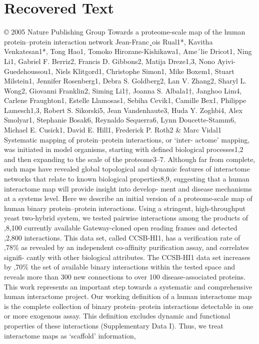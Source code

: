 \section{Recovered Text}
© 2005 Nature Publishing Group
Towards a proteome-scale map of the human
protein–protein interaction network
Jean-Franc¸ois Rual1*, Kavitha Venkatesan1*, Tong Hao1, Tomoko Hirozane-Kishikawa1, Ame´lie Dricot1, Ning Li1,
Gabriel F. Berriz2, Francis D. Gibbons2, Matija Dreze1,3, Nono Ayivi-Guedehoussou1, Niels Klitgord1,
Christophe Simon1, Mike Boxem1, Stuart Milstein1, Jennifer Rosenberg1, Debra S. Goldberg2, Lan V. Zhang2,
Sharyl L. Wong2, Giovanni Franklin2, Siming Li1†, Joanna S. Albala1†, Janghoo Lim4, Carlene Fraughton1,
Estelle Llamosas1, Sebiha Cevik1, Camille Bex1, Philippe Lamesch1,3, Robert S. Sikorski5, Jean Vandenhaute3,
Huda Y. Zoghbi4, Alex Smolyar1, Stephanie Bosak6, Reynaldo Sequerra6, Lynn Doucette-Stamm6,
Michael E. Cusick1, David E. Hill1, Frederick P. Roth2 \& Marc Vidal1
Systematic mapping of protein–protein interactions, or ‘inter-
actome’ mapping, was initiated in model organisms, starting with
deﬁned biological processes1,2 and then expanding to the scale of
the proteome3–7. Although far from complete, such maps have
revealed global topological and dynamic features of interactome
networks that relate to known biological properties8,9, suggesting
that a human interactome map will provide insight into develop-
ment and disease mechanisms at a systems level. Here we describe
an initial version of a proteome-scale map of human binary
protein–protein interactions. Using a stringent, high-throughput
yeast two-hybrid system, we tested pairwise interactions among
the products of ,8,100 currently available Gateway-cloned open
reading frames and detected ,2,800 interactions. This data set,
called CCSB-HI1, has a veriﬁcation rate of ,78\% as revealed by an
independent co-afﬁnity puriﬁcation assay, and correlates signiﬁ-
cantly with other biological attributes. The CCSB-HI1 data set
increases by ,70\% the set of available binary interactions within
the tested space and reveals more than 300 new connections to
over 100 disease-associated proteins. This work represents an
important step towards a systematic and comprehensive human
interactome project.
Our working deﬁnition of a human interactome map is the
complete collection of binary protein–protein interactions detectable
in one or more exogenous assay. This deﬁnition excludes dynamic
and functional properties of these interactions (Supplementary
Data I). Thus, we treat interactome maps as ‘scaffold’ information,
